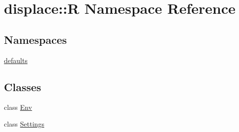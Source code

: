 \hypertarget{namespacedisplace_1_1_r}{}\section{displace\+::R Namespace Reference}
\label{namespacedisplace_1_1_r}
\subsection*{Namespaces}
\begin{DoxyCompactItemize}
\item 
 \mbox{\hyperlink{namespacedisplace_1_1_r_1_1defaults}{defaults}}
\end{DoxyCompactItemize}
\subsection*{Classes}
\begin{DoxyCompactItemize}
\item 
class \mbox{\hyperlink{classdisplace_1_1_r_1_1_env}{Env}}
\item 
class \mbox{\hyperlink{classdisplace_1_1_r_1_1_settings}{Settings}}
\end{DoxyCompactItemize}
